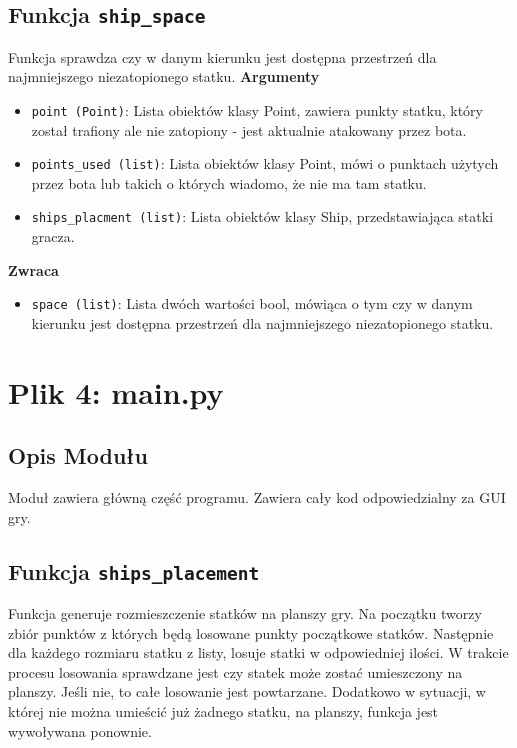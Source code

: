 \documentclass[12pt]{article}
\begin{document}
    \subsection{Funkcja \texttt{ship\_space}}
    Funkcja sprawdza czy w danym kierunku jest dostępna przestrzeń dla najmniejszego niezatopionego statku.
        \textbf{Argumenty}
        \begin{itemize}
            \item \texttt{point (Point)}: Lista obiektów klasy Point, zawiera punkty statku, który został trafiony ale nie zatopiony - jest aktualnie atakowany przez bota.
            \item \texttt{points\_used (list)}: Lista obiektów klasy Point, mówi o punktach użytych przez bota lub takich o których wiadomo, że nie ma tam statku.
            \item \texttt{ships\_placment (list)}: Lista obiektów klasy Ship, przedstawiająca statki gracza.
        \end{itemize}
    \textbf{Zwraca}
        \begin{itemize}
            \item \texttt{space (list)}: Lista dwóch wartości bool, mówiąca o tym czy w danym kierunku jest dostępna przestrzeń dla najmniejszego niezatopionego statku.
        \end{itemize}


\section{Plik 4: main.py}
    \subsection{Opis Modułu}
        Moduł zawiera główną część programu. Zawiera cały kod odpowiedzialny za GUI gry.

    \subsection{Funkcja \texttt{ships\_placement}}
        Funkcja generuje rozmieszczenie statków na planszy gry. Na początku tworzy zbiór punktów z których będą losowane 
        punkty początkowe statków. Następnie dla każdego rozmiaru statku z listy, losuje statki w odpowiedniej ilości.
        W trakcie procesu losowania sprawdzane jest czy statek może zostać umieszczony na planszy. 
        Jeśli nie, to całe losowanie jest powtarzane. Dodatkowo w sytuacji, w której nie można umieścić już żadnego statku,
        na planszy, funkcja jest wywoływana ponownie.\\
        
\end{document}

